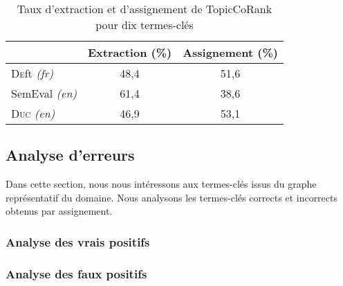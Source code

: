         

        \begin{table}[!h]
          \centering
          \begin{tabular}{l|c|c}
              \toprule
              & Extraction (\%) & Assignement (\%)\\
              \hline
              \textsc{De}ft \textit{(fr)} & 48,4 & 51,6\\
              SemEval \textit{(en)} & 61,4 & 38,6\\
              \textsc{Duc} \textit{(en)} & 46,9 & 53,1\\
              \bottomrule
          \end{tabular}
          \caption{Taux d'extraction et d'assignement de TopicCoRank pour dix
                   termes-clés
                   \label{tab:assignment_ratio}}
        \end{table}

        

        

    \subsection{Analyse d'erreurs}
    \label{subsec:main-domain_specific_keyphrase_annotation-supervised_automatic_keyphrase_annotation-error_analysis}
      Dans cette section, nous nous intéressons aux termes-clés issus du graphe
      représentatif du domaine. Nous analysons les termes-clés corrects et
      incorrects obtenus par assignement.\TODO{\dots}

      \subsubsection{Analyse des vrais positifs}
      \label{subsec:main-domain_specific_keyphrase_annotation-supervised_automatic_keyphrase_annotation-error_analysis-true_positives}

      \subsubsection{Analyse des faux positifs}
      \label{subsec:main-domain_specific_keyphrase_annotation-supervised_automatic_keyphrase_annotation-error_analysis-false_positives}

